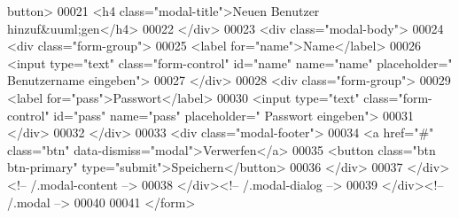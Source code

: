 \begin{DoxyCode}
      button>
00021                   <h4 \textcolor{keyword}{class}=\textcolor{stringliteral}{"modal-title"}>Neuen Benutzer hinzuf&uuml;gen</h4>
00022                 </div>
00023                 <div \textcolor{keyword}{class}=\textcolor{stringliteral}{"modal-body"}>
00024                   <div \textcolor{keyword}{class}=\textcolor{stringliteral}{"form-group"}>
00025                             <label \textcolor{keywordflow}{for}=\textcolor{stringliteral}{"name"}>Name</label>
00026                             <input type=\textcolor{stringliteral}{"text"} \textcolor{keyword}{class}=\textcolor{stringliteral}{"form-control"} \textcolor{keywordtype}{id}=\textcolor{stringliteral}{"name"} name=\textcolor{stringliteral}{"name"} placeholder=\textcolor{stringliteral}{"
      Benutzername eingeben"}>
00027                           </div>
00028                           <div \textcolor{keyword}{class}=\textcolor{stringliteral}{"form-group"}>
00029                             <label \textcolor{keywordflow}{for}=\textcolor{stringliteral}{"pass"}>Passwort</label>
00030                             <input type=\textcolor{stringliteral}{"text"} \textcolor{keyword}{class}=\textcolor{stringliteral}{"form-control"} \textcolor{keywordtype}{id}=\textcolor{stringliteral}{"pass"} name=\textcolor{stringliteral}{"pass"} placeholder=\textcolor{stringliteral}{"
      Passwort eingeben"}>
00031                           </div>
00032                 </div>
00033                 <div \textcolor{keyword}{class}=\textcolor{stringliteral}{"modal-footer"}>
00034                   <a href=\textcolor{stringliteral}{"#"} \textcolor{keyword}{class}=\textcolor{stringliteral}{"btn"} data-dismiss=\textcolor{stringliteral}{"modal"}>Verwerfen</a>
00035                   <button \textcolor{keyword}{class}=\textcolor{stringliteral}{"btn btn-primary"} type=\textcolor{stringliteral}{"submit"}>Speichern</button>
00036                 </div>
00037               </div><!-- /.modal-content -->
00038             </div><!-- /.modal-dialog -->
00039           </div><!-- /.modal -->
00040           
00041           </form>
\end{DoxyCode}
